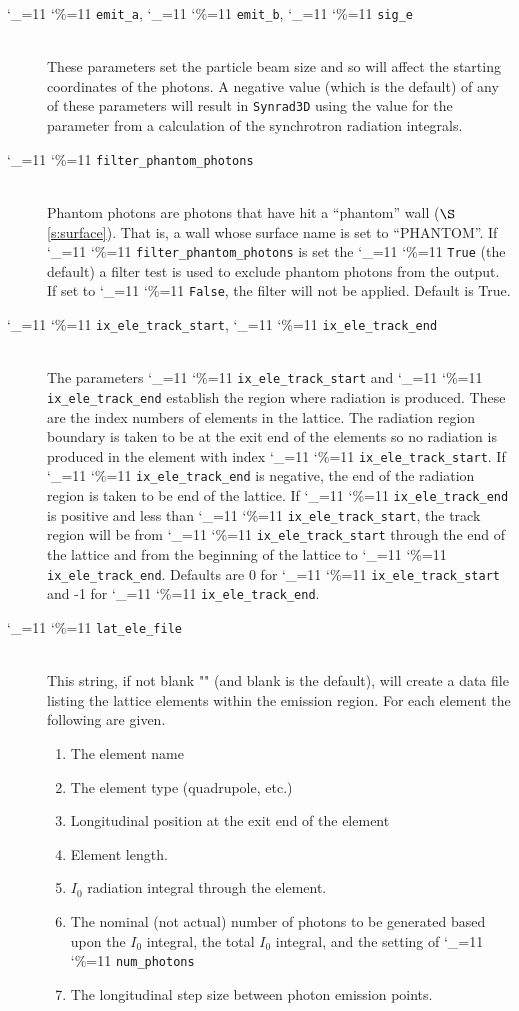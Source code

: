 \documentclass[11pt,openany]{report}
\newcommand{\sref}[1]{$\S$\ref{#1}}
\newcommand{\srthree}{\texttt{Synrad3D}\xspace}
\newcommand\ttcmd{\begingroup\catcode`\_=11 \catcode`\%=11 \dottcmd}
\newcommand\dottcmd[1]{\texttt{#1}\endgroup}
\newcommand{\vn}{\ttcmd}
\newcommand{\Newline}{\hfil \\}
\begin{document}
\begin{description}
  \item[\vn{emit_a}, \vn{emit_b}, \vn{sig_e}] \Newline
These parameters set the particle beam size and so will affect the starting coordinates of
the photons. A negative value (which is the default) of any of these parameters will result in \srthree 
using the value for the parameter from a calculation of the synchrotron radiation integrals.

  \item[\vn{filter_phantom_photons}] \Newline
Phantom photons are photons that have hit a ``phantom'' wall (\sref{s:surface}).  That is,
a wall whose surface name is set to ``PHANTOM''. If \vn{filter_phantom_photons} is set the
\vn{True} (the default) a filter test is used to exclude phantom photons from the output.
If set to \vn{False}, the filter will not be applied. Default is True.

  \item[\vn{ix_ele_track_start}, \vn{ix_ele_track_end}] \Newline
The parameters \vn{ix_ele_track_start} and \vn{ix_ele_track_end} establish
the region where radiation is produced. These are the index numbers of 
elements in the lattice. The radiation region boundary is taken to be at
the exit end of the elements so no radiation is produced in the element
with index \vn{ix_ele_track_start}. If \vn{ix_ele_track_end} is negative,
the end of the radiation region is taken to be end of the lattice.
If \vn{ix_ele_track_end} is positive and less than \vn{ix_ele_track_start},
the track region will be from \vn{ix_ele_track_start} through the
end of the lattice and from the beginning of the lattice to \vn{ix_ele_track_end}.
Defaults are 0 for \vn{ix_ele_track_start} and -1 for \vn{ix_ele_track_end}.

  \item[\vn{lat_ele_file}] \Newline
This string, if not blank "" (and blank is the default), will create a data file listing  the lattice
elements within the emission region. For each element the following are given. 
  \begin{enumerate}
  \item
    The element name
  \item
    The element type (quadrupole, etc.)
  \item
    Longitudinal position at the exit end of the element
  \item
    Element length.
  \item
    $I_0$ radiation integral through the element.
  \item
    The nominal (not actual) number of photons to be generated based upon the $I_0$ integral,
    the total $I_0$ integral, and the setting of \vn{num_photons}
  \item
    The longitudinal step size between photon emission points.
  \end{enumerate}


\end{description}
\end{document}
